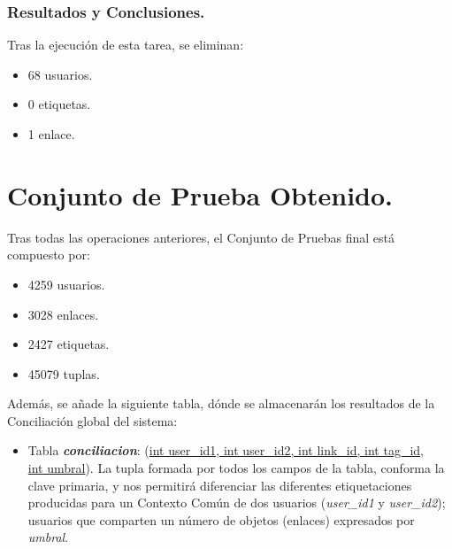 \subsubsection{Resultados y Conclusiones.}

Tras la ejecución de esta tarea, se eliminan:
\begin{itemize}
\item    68 usuarios.
\item    0 etiquetas.
\item    1 enlace.
\end{itemize}

\section{Conjunto de Prueba Obtenido.}

Tras todas las operaciones anteriores, el Conjunto de Pruebas final está compuesto por:
\begin{itemize}
	\item 4259 usuarios.
	\item 3028 enlaces.
	\item 2427 etiquetas.
	\item 45079 tuplas.
\end{itemize}

Además, se añade la siguiente tabla, dónde se almacenarán los resultados de la Conciliación global del sistema:
\begin{itemize}
	\item Tabla \emph{{\bf conciliacion}}: (\underline{int user\_id1, int user\_id2,  int link\_id, int tag\_id,} \\ \underline{int umbral}). La tupla formada por todos los campos de la tabla, conforma la clave primaria, y nos permitirá diferenciar las diferentes etiquetaciones producidas para un Contexto Común de dos usuarios (\emph{user\_id1} y \emph{user\_id2}); usuarios que comparten un número de objetos (enlaces) expresados por \emph{umbral}.
\end{itemize}



